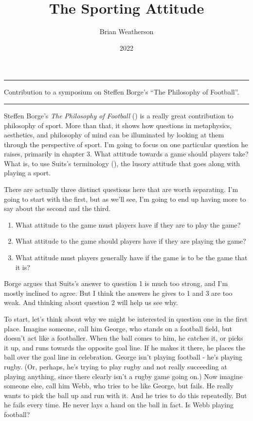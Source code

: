\documentclass[
  10pt,
  letterpaper,
  DIV=11,
  numbers=noendperiod,
  twoside]{scrartcl}
\title{The Sporting Attitude}
\author{Brian Weatherson}
\date{2022}
\providecommand{\tightlist}{%
  \setlength{\itemsep}{0pt}\setlength{\parskip}{0pt}}\usepackage{longtable,booktabs,array}
\renewenvironment{abstract}
 {\vspace{-1.25cm}
 \quotation\small\noindent\rule{\linewidth}{.5pt}\par\smallskip
 \noindent }
 {\par\noindent\rule{\linewidth}{.5pt}\endquotation}
\begin{document}
\maketitle
\begin{abstract}
Contribution to a symposium on Steffen Borge's ``The Philosophy of
Football''.
\end{abstract}


Steffen Borge's \emph{The Philosophy of Football}
() is a really great contribution to
philosophy of sport. More than that, it shows how questions in
metaphysics, aesthetics, and philosophy of mind can be illuminated by
looking at them through the perspective of sport. I'm going to focus on
one particular question he raises, primarily in chapter 3. What attitude
towards a game should players take? What is, to use Suits's terminology
(), the lusory attitude that goes
along with playing a sport.

There are actually three distinct questions here that are worth
separating. I'm going to start with the first, but as we'll see, I'm
going to end up having more to say about the second and the third.

\begin{enumerate}
\def\labelenumi{\arabic{enumi}.}
\tightlist
\item
  What attitude to the game must players have if they are to play the
  game?
\item
  What attitude to the game should players have if they are playing the
  game?
\item
  What attitude must players generally have if the game is to be the
  game that it is?
\end{enumerate}

Borge argues that Suits's answer to question 1 is much too strong, and
I'm mostly inclined to agree. But I think the answers he gives to 1 and
3 are too weak. And thinking about question 2 will help us see why.

To start, let's think about why we might be interested in question one
in the first place. Imagine someone, call him George, who stands on a
football field, but doesn't act like a footballer. When the ball comes
to him, he catches it, or picks it up, and runs towards the opposite
goal line. If he makes it there, he places the ball over the goal line
in celebration. George isn't playing football - he's playing rugby. (Or,
perhaps, he's trying to play rugby and not really succeeding at playing
anything, since there clearly isn't a rugby game going on.) Now imagine
someone else, call him Webb, who tries to be like George, but fails. He
really wants to pick the ball up and run with it. And he tries to do
this repeatedly. But he fails every time. He never lays a hand on the
ball in fact. Is Webb playing football?
\end{document}
